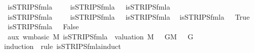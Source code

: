 \begin{isabellebody}
{\isacharbar}{\kern0pt}\ {\isachardoublequoteopen}is{\isacharunderscore}{\kern0pt}STRIPS{\isacharunderscore}{\kern0pt}fmla\ {\isacharparenleft}{\kern0pt}{\isasymphi}\ \isactrlbold {\isasymand}\ {\isasymphi}\ {\isasymlongleftrightarrow}\ is{\isacharunderscore}{\kern0pt}STRIPS{\isacharunderscore}{\kern0pt}fmla\ {\isasymphi}\ {\isasymand}\ is{\isacharunderscore}{\kern0pt}STRIPS{\isacharunderscore}{\kern0pt}fmla\ {\isasymphi}\isanewline
{\isacharbar}{\kern0pt}\ {\isachardoublequoteopen}is{\isacharunderscore}{\kern0pt}STRIPS{\isacharunderscore}{\kern0pt}fmla\ {\isacharparenleft}{\kern0pt}{\isasymphi}\ \isactrlbold {\isasymor}\ {\isasymphi}\ {\isasymlongleftrightarrow}\ is{\isacharunderscore}{\kern0pt}STRIPS{\isacharunderscore}{\kern0pt}fmla\ {\isasymphi}\ {\isasymand}\ is{\isacharunderscore}{\kern0pt}STRIPS{\isacharunderscore}{\kern0pt}fmla\ {\isasymphi}\isanewline
{\isacharbar}{\kern0pt}\ {\isachardoublequoteopen}is{\isacharunderscore}{\kern0pt}STRIPS{\isacharunderscore}{\kern0pt}fmla\ {\isacharparenleft}{\kern0pt}\isactrlbold {\isasymnot}{\isasymbottom}{\isacharparenright}{\kern0pt}\ {\isasymlongleftrightarrow}\ True{\isachardoublequoteclose}\isanewline
{\isacharbar}{\kern0pt}\ {\isachardoublequoteopen}is{\isacharunderscore}{\kern0pt}STRIPS{\isacharunderscore}{\kern0pt}fmla\ {\isacharunderscore}{\kern0pt}\ {\isasymlongleftrightarrow}\ False{\isachardoublequoteclose}\isanewline
\isanewline
{}\isamarkupfalse%
\ aux{}{\isacharcolon}{\kern0pt}\ {\isachardoublequoteopen}{\isasymlbrakk}wm{\isacharunderscore}{\kern0pt}basic\ M{\isacharsemicolon}{\kern0pt}\ is{\isacharunderscore}{\kern0pt}STRIPS{\isacharunderscore}{\kern0pt}fmla\ {\isasymphi}{\isacharsemicolon}{\kern0pt}\ valuation\ M\ {\isasymTurnstile}\ {\isasymphi}{\isacharsemicolon}{\kern0pt}\ {\isasymforall}G{\isasymin}M{\isachardot}{\kern0pt}\ {\isasymA}\ {\isasymTurnstile}\ G{\isasymrbrakk}\ {\isasymLongrightarrow}\ {\isasymA}\ {\isasymTurnstile}\ {\isasymphi}{\isachardoublequoteclose}\isanewline
%
\isadelimproof
\ \ %
\endisadelimproof
%
\isatagproof
{}\isamarkupfalse%
{\isacharparenleft}{\kern0pt}induction\ {\isasymphi}\ rule{\isacharcolon}{\kern0pt}\ is{\isacharunderscore}{\kern0pt}STRIPS{\isacharunderscore}{\kern0pt}fmla{\isachardot}{\kern0pt}induct{\isacharparenright}{\kern0pt}\isanewline

\end{isabellebody}
